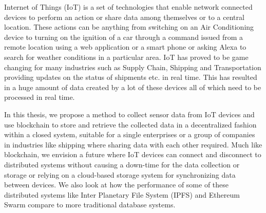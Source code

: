 \documentclass[11pt,openright]{report}
\begin{document}
\thesistitlepage
\copyrightpage

\newpage


\begin{thesisabstract}

Internet of Things (IoT) is a set of technologies that enable network connected devices to perform an action or share data among themselves or to a central location. These actions can be anything from switching on an Air Conditioning device to turning on the ignition of a car through a command issued from a remote location using a web application or a smart phone or asking Alexa to search for weather conditions in a particular area. IoT has proved to be game changing for many industries such as Supply Chain, Shipping and Transportation providing updates on the status of shipments etc. in real time. This has resulted in a huge amount of data created by a lot of these devices all of which need to be processed in real time. 

In this thesis, we propose a method to collect sensor data from IoT devices and use blockchain to store and retrieve the collected data in a decentralized fashion within a closed system, suitable for a single enterprises or a group of companies in industries like shipping where sharing data with each other required. Much like blockchain, we envision a future where IoT devices can connect and disconnect to distributed systems without causing a down-time for the data collection or storage or relying on a cloud-based storage system for synchronizing data between devices. We also look at how the performance of some of these distributed systems like Inter Planetary File System (IPFS) and Ethereum Swarm compare to more traditional database systems.

\end{thesisabstract}


\end{document}
